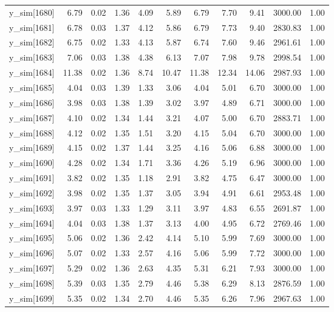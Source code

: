 \begin{table}[ht]
\begin{tabular}{rrrrrrrrrrr}
  y\_sim[1680] & 6.79 & 0.02 & 1.36 & 4.09 & 5.89 & 6.79 & 7.70 & 9.41 & 3000.00 & 1.00 \\ 
  y\_sim[1681] & 6.78 & 0.03 & 1.37 & 4.12 & 5.86 & 6.79 & 7.73 & 9.40 & 2830.83 & 1.00 \\ 
  y\_sim[1682] & 6.75 & 0.02 & 1.33 & 4.13 & 5.87 & 6.74 & 7.60 & 9.46 & 2961.61 & 1.00 \\ 
  y\_sim[1683] & 7.06 & 0.03 & 1.38 & 4.38 & 6.13 & 7.07 & 7.98 & 9.78 & 2998.54 & 1.00 \\ 
  y\_sim[1684] & 11.38 & 0.02 & 1.36 & 8.74 & 10.47 & 11.38 & 12.34 & 14.06 & 2987.93 & 1.00 \\ 
  y\_sim[1685] & 4.04 & 0.03 & 1.39 & 1.33 & 3.06 & 4.04 & 5.01 & 6.70 & 3000.00 & 1.00 \\ 
  y\_sim[1686] & 3.98 & 0.03 & 1.38 & 1.39 & 3.02 & 3.97 & 4.89 & 6.71 & 3000.00 & 1.00 \\ 
  y\_sim[1687] & 4.10 & 0.02 & 1.34 & 1.44 & 3.21 & 4.07 & 5.00 & 6.70 & 2883.71 & 1.00 \\ 
  y\_sim[1688] & 4.12 & 0.02 & 1.35 & 1.51 & 3.20 & 4.15 & 5.04 & 6.70 & 3000.00 & 1.00 \\ 
  y\_sim[1689] & 4.15 & 0.02 & 1.37 & 1.44 & 3.25 & 4.16 & 5.06 & 6.88 & 3000.00 & 1.00 \\ 
  y\_sim[1690] & 4.28 & 0.02 & 1.34 & 1.71 & 3.36 & 4.26 & 5.19 & 6.96 & 3000.00 & 1.00 \\ 
  y\_sim[1691] & 3.82 & 0.02 & 1.35 & 1.18 & 2.91 & 3.82 & 4.75 & 6.47 & 3000.00 & 1.00 \\ 
  y\_sim[1692] & 3.98 & 0.02 & 1.35 & 1.37 & 3.05 & 3.94 & 4.91 & 6.61 & 2953.48 & 1.00 \\ 
  y\_sim[1693] & 3.97 & 0.03 & 1.33 & 1.29 & 3.11 & 3.97 & 4.83 & 6.55 & 2691.87 & 1.00 \\ 
  y\_sim[1694] & 4.04 & 0.03 & 1.38 & 1.37 & 3.13 & 4.00 & 4.95 & 6.72 & 2769.46 & 1.00 \\ 
  y\_sim[1695] & 5.06 & 0.02 & 1.36 & 2.42 & 4.14 & 5.10 & 5.99 & 7.69 & 3000.00 & 1.00 \\ 
  y\_sim[1696] & 5.07 & 0.02 & 1.33 & 2.57 & 4.16 & 5.06 & 5.99 & 7.72 & 3000.00 & 1.00 \\ 
  y\_sim[1697] & 5.29 & 0.02 & 1.36 & 2.63 & 4.35 & 5.31 & 6.21 & 7.93 & 3000.00 & 1.00 \\ 
  y\_sim[1698] & 5.39 & 0.03 & 1.35 & 2.79 & 4.46 & 5.38 & 6.29 & 8.13 & 2876.59 & 1.00 \\ 
  y\_sim[1699] & 5.35 & 0.02 & 1.34 & 2.70 & 4.46 & 5.35 & 6.26 & 7.96 & 2967.63 & 1.00 \\ 

\end{tabular}
\end{table}
